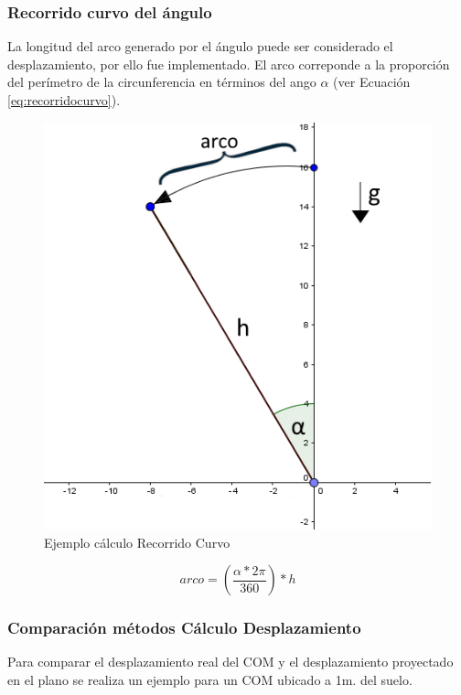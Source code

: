 \documentclass[12pt,a4paper]{article}
\begin{document}
\newpage
\subsubsection{Recorrido curvo del ángulo}
La longitud del arco generado por el ángulo puede ser considerado el desplazamiento, por ello fue implementado.
El arco correponde a la proporción del perímetro de la circunferencia en términos del ango $\alpha$ (ver Ecuación \ref{eq:recorridocurvo}).

\begin{figure}[H]
	\centering
	\includegraphics[scale=0.7]{images/calculoRecorridoCurvo}
	\caption{Ejemplo cálculo Recorrido Curvo}
	\label{fig:recorridocurvo}
\end{figure}

\begin{equation}
	\label{eq:recorridocurvo}
	arco=\left(\frac{\alpha*2\pi}{360}\right)*h
\end{equation}

\newpage
\subsubsection{Comparación métodos Cálculo Desplazamiento}
Para comparar el desplazamiento real del COM y el desplazamiento proyectado en el plano se realiza un ejemplo para un COM ubicado a 1m. del suelo.
\end{document}
